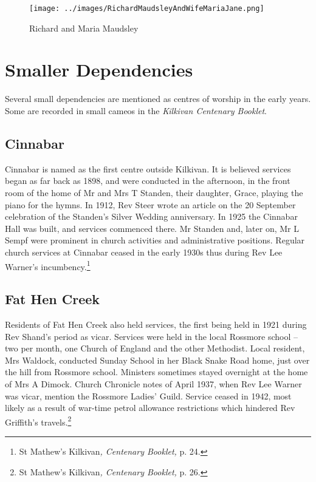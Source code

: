 \begin{figure}
\begin{center}
\texttt{[image: ../images/RichardMaudsleyAndWifeMariaJane.png]}
\caption{Richard and Maria Maudsley}
\end{center}
\end{figure}




\section{Smaller Dependencies}



Several small dependencies are mentioned as centres of worship in the early years. Some are recorded in small cameos in the \emph{Kilkivan Centenary Booklet}.



\subsection{Cinnabar}



Cinnabar is named as the first centre outside Kilkivan. It is believed services began as far back as 1898, and were conducted in the afternoon, in the front room of the home of Mr and Mrs T Standen, their daughter, Grace, playing the piano for the hymns. In 1912, Rev Steer wrote an article on the 20 September celebration of the Standen's Silver Wedding anniversary. In 1925 the Cinnabar Hall was built, and services commenced there. Mr Standen and, later on, Mr L Sempf were prominent in church activities and administrative positions. Regular church services at Cinnabar ceased in the early 1930s thus during Rev Lee Warner's incumbency.\footnote{St Mathew's Kilkivan\emph{, Centenary Booklet,} p. 24.}


\subsection{Fat Hen Creek}



Residents of Fat Hen Creek also held services, the first being held in 1921 during Rev Shand's period as vicar. Services were held in the local Rossmore school -- two per month, one Church of England and the other Methodist. Local resident, Mrs Waldock, conducted Sunday School in her Black Snake Road home, just over the hill from Rossmore school. Ministers sometimes stayed overnight at the home of Mrs A Dimock. Church Chronicle notes of April 1937, when Rev Lee Warner was vicar, mention the Rossmore Ladies' Guild. Service ceased in 1942, most likely as a result of war-time petrol allowance restrictions which hindered Rev Griffith's travels.\footnote{St Mathew's Kilkivan\emph{, Centenary Booklet,} p. 26.}


